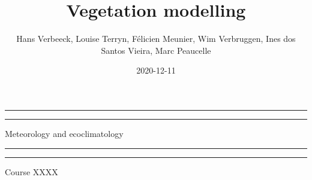 \documentclass[12pt,oneside]{book}
\title{Vegetation modelling}
\author{Hans Verbeeck, Louise Terryn, Félicien Meunier, Wim Verbruggen, Ines dos
Santos Vieira, Marc Peaucelle}
\date{2020-12-11}
\begin{document}
\maketitle

\newcommand{\plogo}{\fbox{$\mathcal{PL}$}} %
\frontmatter


\begin{titlepage} %

	\centering %
	
	\scshape %
	
	\vspace*{\baselineskip} %
	
	
	\vspace{12\baselineskip}
	
	\rule{\textwidth}{1.6pt}\vspace*{-\baselineskip}\vspace*{2pt} %
	\rule{\textwidth}{0.4pt} %
	
	\vspace{0.75\baselineskip} %
	
	{\LARGE Meteorology and ecoclimatology\\} %
	
	\vspace{0.75\baselineskip} %
	
	\rule{\textwidth}{0.4pt}\vspace*{-\baselineskip}\vspace{3.2pt} %
	\rule{\textwidth}{1.6pt} %
	
	\vspace{2\baselineskip} %
	
	
	Course XXXX %
	
	\vspace*{3\baselineskip} %
	
	

\end{titlepage}
\end{document}
